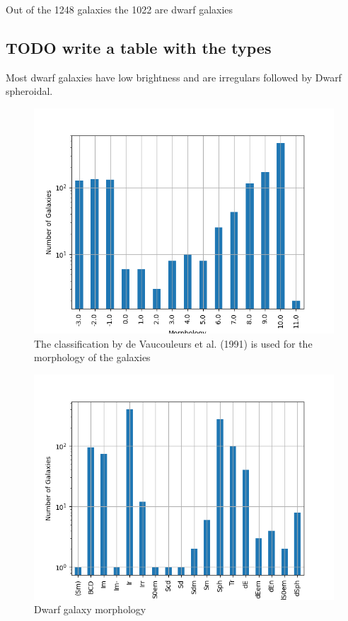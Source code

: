 \documentclass[a4paper,twocolumn]{article}
\begin{document}
Out of the 1248 galaxies the 1022 are dwarf galaxies

\subsection{{\bfseries\sffamily TODO} write a table with the types}
\label{sec:org8b9d595}

Most dwarf galaxies have low brightness and are irregulars followed by Dwarf spheroidal.

\begin{figure}[htbp]
\centering
\includegraphics[width=.9\linewidth]{./figs/hist-Type.png}
\caption{\label{Types of galaxies}The classification by de Vaucouleurs et al. (1991) is used for the morphology of the galaxies}
\end{figure}

\begin{figure}[htbp]
\centering
\includegraphics[width=.9\linewidth]{./figs/hist-Tdw1.png}
\caption{\label{Types of dwarf galaxies}Dwarf galaxy morphology}
\end{figure}
\end{document}
